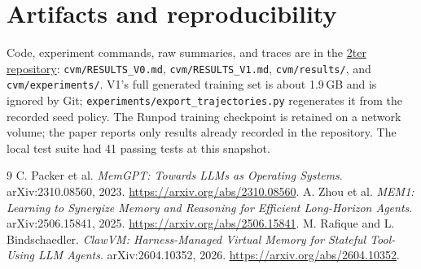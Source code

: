 \documentclass[10pt,letterpaper]{article}
\begin{document}
\section*{Artifacts and reproducibility}

Code, experiment commands, raw summaries, and traces are in the \href{https://github.com/nikitph/2ter}{2ter repository}: \texttt{cvm/RESULTS\_V0.md}, \texttt{cvm/RESULTS\_V1.md}, \texttt{cvm/results/}, and \texttt{cvm/experiments/}. V1's full generated training set is about 1.9\,GB and is ignored by Git; \texttt{experiments/export\_trajectories.py} regenerates it from the recorded seed policy. The Runpod training checkpoint is retained on a network volume; the paper reports only results already recorded in the repository. The local test suite had 41 passing tests at this snapshot.

\begin{thebibliography}{9}
 C. Packer et al. \emph{MemGPT: Towards LLMs as Operating Systems}. arXiv:2310.08560, 2023. \url{https://arxiv.org/abs/2310.08560}.
 A. Zhou et al. \emph{MEM1: Learning to Synergize Memory and Reasoning for Efficient Long-Horizon Agents}. arXiv:2506.15841, 2025. \url{https://arxiv.org/abs/2506.15841}.
 M. Rafique and L. Bindschaedler. \emph{ClawVM: Harness-Managed Virtual Memory for Stateful Tool-Using LLM Agents}. arXiv:2604.10352, 2026. \url{https://arxiv.org/abs/2604.10352}.
\end{thebibliography}
\end{document}

